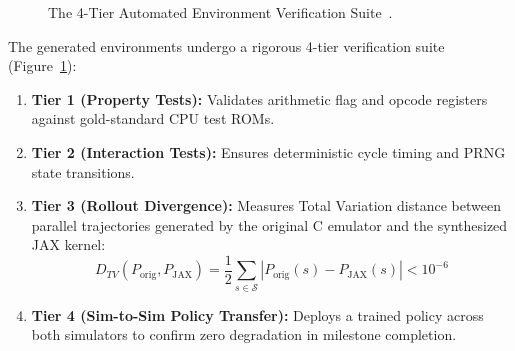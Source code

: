 \documentclass[journal,10pt,twocolumn]{IEEEtran}
\begin{document}
\begin{figure}[h]
\centering
{}
\caption{The 4-Tier Automated Environment Verification Suite~\cite{karten2026autogen}.}
\label{fig:tier_verification}
\end{figure}

The generated environments undergo a rigorous 4-tier verification suite (Figure~\ref{fig:tier_verification}):
\begin{enumerate}
    \item \textbf{Tier 1 (Property Tests):} Validates arithmetic flag and opcode registers against gold-standard CPU test ROMs.
    \item \textbf{Tier 2 (Interaction Tests):} Ensures deterministic cycle timing and PRNG state transitions.
    \item \textbf{Tier 3 (Rollout Divergence):} Measures Total Variation distance between parallel trajectories generated by the original C emulator and the synthesized JAX kernel:
    \begin{equation}
    D_{TV}(P_{\text{orig}}, P_{\text{JAX}}) = \frac{1}{2} \sum_{s \in \mathcal{S}} |P_{\text{orig}}(s) - P_{\text{JAX}}(s)| < 10^{-6}
    \end{equation}
    \item \textbf{Tier 4 (Sim-to-Sim Policy Transfer):} Deploys a trained policy across both simulators to confirm zero degradation in milestone completion.
\end{enumerate}
\end{document}

